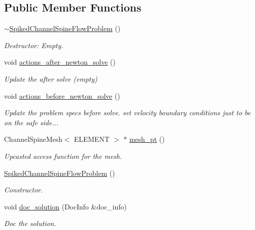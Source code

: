 \subsection*{Public Member Functions}
\begin{DoxyCompactItemize}
\item 
\hyperlink{classSpikedChannelSpineFlowProblem_a48ee634b61ca54658104d476c683264e}{$\sim$\+Spiked\+Channel\+Spine\+Flow\+Problem} ()
\begin{DoxyCompactList}\small\item\em Destructor\+: Empty. \end{DoxyCompactList}\item 
void \hyperlink{classSpikedChannelSpineFlowProblem_a4aca63a902ad477dbe1cb9d170aebbc2}{actions\+\_\+after\+\_\+newton\+\_\+solve} ()
\begin{DoxyCompactList}\small\item\em Update the after solve (empty) \end{DoxyCompactList}\item 
void \hyperlink{classSpikedChannelSpineFlowProblem_a98e464ea1ab1c14d703415d63e89115e}{actions\+\_\+before\+\_\+newton\+\_\+solve} ()
\begin{DoxyCompactList}\small\item\em Update the problem specs before solve. set velocity boundary conditions just to be on the safe side... \end{DoxyCompactList}\item 
Channel\+Spine\+Mesh$<$ E\+L\+E\+M\+E\+NT $>$ $\ast$ \hyperlink{classSpikedChannelSpineFlowProblem_a2125f8744b2e4a8f76a2bafee264db94}{mesh\+\_\+pt} ()
\begin{DoxyCompactList}\small\item\em Upcasted access function for the mesh. \end{DoxyCompactList}\item 
\hyperlink{classSpikedChannelSpineFlowProblem_a45f0bab84a0ecc00b7928d2e982af1bb}{Spiked\+Channel\+Spine\+Flow\+Problem} ()
\begin{DoxyCompactList}\small\item\em Constructor. \end{DoxyCompactList}\item 
void \hyperlink{classSpikedChannelSpineFlowProblem_ab9fc5d18831a928a3ad7e2e13efaa6c4}{doc\+\_\+solution} (Doc\+Info \&doc\+\_\+info)
\begin{DoxyCompactList}\small\item\em Doc the solution. \end{DoxyCompactList}\end{DoxyCompactItemize}
